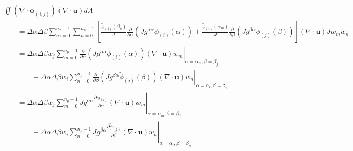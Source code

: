 \documentclass{article}
\newcommand{\vb}{\mathbf}
\newcommand{\vg}{\boldsymbol}
\newcommand{\pdiff}[2]{\frac{\partial #1}{\partial #2}}
\begin{document}
\begin{align}
& \iint (\nabla \cdot \vg{\phi}_{(i,j)}) (\nabla \cdot \vb{u}) dA \nonumber \\
& \qquad = \Delta \alpha \Delta \beta \sum_{m=0}^{n_p-1} \sum_{n=0}^{n_p-1} \left[ \frac{\tilde{\phi}_{(j)}(\beta_n)}{J} \pdiff{}{\alpha} \left( J g^{\alpha \alpha} \tilde{\phi}_{(i)}(\alpha) \right)  + \frac{\tilde{\phi}_{(i)}(\alpha_m)}{J} \pdiff{}{\beta} \left( J g^{\beta \alpha} \tilde{\phi}_{(j)}(\beta) \right) \right] (\nabla \cdot \vb{u}) J w_m w_n \\
& \qquad = \Delta \alpha \Delta \beta w_j \sum_{m = 0}^{n_p-1} \left. \pdiff{}{\alpha} \left( J g^{\alpha \alpha} \tilde{\phi}_{(i)}(\alpha) \right) (\nabla \cdot \vb{u}) w_m \right\vert_{\alpha = \alpha_m, \beta = \beta_j} \nonumber \\
& \qquad \qquad + \Delta \alpha \Delta \beta w_i \sum_{n = 0}^{n_p-1} \left. \pdiff{}{\beta} \left( J g^{\beta \alpha} \tilde{\phi}_{(j)}(\beta) \right) (\nabla \cdot \vb{u}) w_n \right\vert_{\alpha = \alpha_i, \beta = \beta_n} \\
& \qquad = \Delta \alpha \Delta \beta w_j \sum_{m = 0}^{n_p-1} \left. J g^{\alpha \alpha} \pdiff{\tilde{\phi}_{(i)}}{\alpha} (\nabla \cdot \vb{u}) w_m \right\vert_{\alpha = \alpha_m, \beta = \beta_j} \nonumber \\
& \qquad \qquad + \Delta \alpha \Delta \beta w_i \sum_{n = 0}^{n_p-1} \left. J g^{\beta \alpha} \pdiff{\tilde{\phi}_{(j)}}{\beta} (\nabla \cdot \vb{u}) w_n \right\vert_{\alpha = \alpha_i, \beta = \beta_n} \label{eq:VecHyperviscosityZeroBetaDiv}
\end{align}
\end{document}
